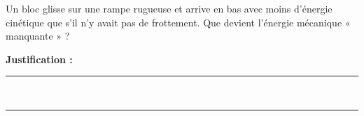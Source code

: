 Un bloc glisse sur une rampe rugueuse et arrive en bas avec moins d'énergie cinétique que s'il n'y avait pas de frottement. Que devient l'énergie mécanique « manquante » ?

\choices

\noindent\textbf{Justification :} \hrulefill \\[2.5ex]
\rule{\linewidth}{0.4pt} \\[2.5ex]
\rule{\linewidth}{0.4pt}
\vfill
